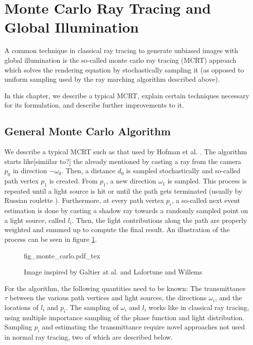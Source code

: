 \section{Monte Carlo Ray Tracing and Global Illumination}
A common technique in classical ray tracing to generate unbiased images with global illumination is the so-called monte carlo ray tracing (MCRT) approach which solves the rendering equation by stochastically sampling it (as opposed to uniform sampling used by the ray marching algorithm described above).

In this chapter, we describe a typical MCRT, explain certain techniques necessary for its formulation, and describe further improvements to it. 
\subsection{General Monte Carlo Algorithm}
We describe a typical MCRT such as that used by Hofman et al. \cite{10.1145/3451256}.
The algorithm starts like[simiilar to?] the already mentioned by casting a ray from the camera $p_0$ in direction $-\omega_0$. Then, a distance $d_0$ is sampled stochastically and so-called path vertex $p_1$ is created. From $p_1$, a new direction $\omega_1$ is sampled. This process is repeated until a light source is hit or until the path gets terminated (usually by Russian roulette \cite{P-766}). Furthermore, at every path vertex $p_i$, a so-called next event estimation \cite{10.1145/3305366.3328079} is done by casting a shadow ray towards a randomly sampled point on a light source, called $l_i$. Then, the light contributions along the path are properly weighted \cite{10.1145/218380.218498} and summed up to compute the final result.
An illustration of the process can be seen in figure \ref{fig:monte_carlo}.


\begin{figure}
\centering
\def\svgwidth{\columnwidth}
{fig_monte_carlo.pdf_tex}

\caption{Image inspired by Galtier at al. \cite{GALTIER201357} and Lafortune and Willems \cite{bidirectional-ray-tracing}}
\label{fig:monte_carlo}
\end{figure}


For the algorithm, the following quantities need to be known: The transmittance $\tau$ between the various path vertices and light sources, the directions $\omega_i$, and the locations of $l_i$ and $p_i$.
The sampling of $\omega_i$ and $l_i$ works like in classical ray tracing, using multiple importance sampling\cite{10.1145/218380.218498} of the phase function and light distribution. Sampling $p_i$ and estimating the transmittance require novel approaches not used in normal ray tracing, two of which are described below. 
